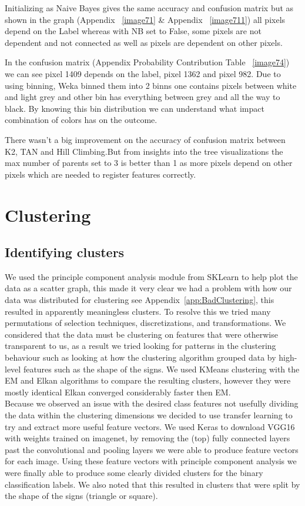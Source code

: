 \documentclass[11pt]{article}
\begin{document}
Initializing as Naive Bayes gives the same accuracy and confusion matrix but as shown in the graph (Appendix ~\ref{image71} \& Appendix ~\ref{image711}) all pixels depend on the Label whereas with NB set to False, some pixels are not dependent and not connected as well as pixels are dependent on other pixels.

In the confusion matrix (Appendix Probability Contribution Table ~\ref{image74}) we can see pixel 1409 depends on the label, pixel 1362 and pixel 982. Due to using binning, Weka binned them into 2 binns one contains pixels between white and light grey and other bin has everything between grey and all the way to black. By knowing this bin distribution we can understand what impact combination of colors has on the outcome.

There wasn't a big improvement on the accuracy of confusion matrix between K2, TAN and Hill Climbing.But from insights into the tree visualizations the max number of parents set to 3 is better than 1 as more pixels depend on other pixels which are needed to register features correctly.


\pagebreak

\section{Clustering}
\subsection{Identifying clusters}
We used the principle component analysis module from SKLearn to help plot the data as a scatter graph, this made it very clear we had a problem with how our data was distributed for clustering see Appendix~\ref{app:BadClustering}, this resulted in apparently meaningless clusters.
To resolve this we tried many permutations of selection techniques, discretizations, and transformations. 
We considered that the data must be clustering on features that were otherwise transparent to us, as a result we tried looking for patterns in the clustering behaviour such as looking at how the clustering algorithm grouped data by high-level features such as the shape of the signs.
We used KMeans clustering with the EM and Elkan algorithms to compare the resulting clusters, however they were mostly identical Elkan converged considerably faster then EM.\\
Because we observed an issue with the desired class features not usefully dividing the data within the clustering dimensions we decided to use transfer learning to try and extract more useful feature vectors.
We used Keras to download VGG16 with weights trained on imagenet, by removing the (top) fully connected layers past the convolutional and pooling layers we were able to produce feature vectors for each image. Using these feature vectors with principle component analysis we were finally able to produce some clearly divided clusters for the binary classification labels. 
We also noted that this resulted in clusters that were split by the shape of the signs (triangle or square).   
\end{document}
